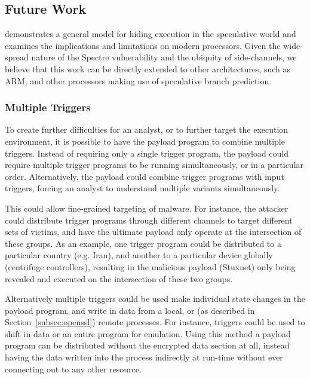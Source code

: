 \subsection{Future Work}
\label{subsec:future-work}

\speculake demonstrates a general model for hiding execution in 
the speculative world and examines the implications and limitations on
modern processors. Given the wide-spread nature of the Spectre vulnerability 
and the ubiquity of side-channels, we believe that this work can 
be directly extended to other architectures, such as ARM, and other processors
making use of speculative branch prediction.

\subsubsection{Multiple Triggers}
To create further difficulties for an analyst, or to further target the
execution environment, it is possible to have the payload program to combine
multiple triggers. Instead of requiring only a single trigger program, the
payload could require multiple trigger programs to be running simultaneously, or
in a particular order. Alternatively, the payload could combine trigger programs
with input triggers, forcing an analyst to understand multiple variants
simultaneously.

This could allow fine-grained targeting of malware. For instance, the attacker
could distribute trigger programs through different channels to target different
sets of victims, and have the ultimate payload only operate at the intersection
of these groups. As an example, one trigger program could be distributed to a
particular country (e.g. Iran), and another to a particular device globally
(centrifuge controllers), resulting in the malicious payload (Stuxnet) only
being revealed and executed on the intersection of these two groups.


\smallskip

Alternatively multiple triggers could be used make individual state changes in
the payload program, and write in data from a local, or (as described in
Section~\ref{subsec:openssl}) remote processes. For instance, triggers could be
used to shift in data or an entire program for emulation.
Using this method a payload program can be distributed without the encrypted
data section at all, instead having the data written into the process indirectly
at run-time without ever connecting out to any other resource.

